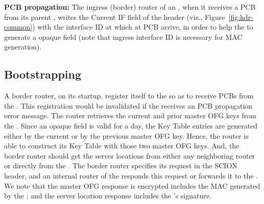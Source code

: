 {\bf PCB propagation: } The ingress (border) router of an \AD, when it receives a PCB from its parent \AD, writes the Current IF field of the header (viz., Figure~\ref{fig:hdr-common}) with the interface ID at which at PCB arrive, in order to help the \BS to generate a opaque field (note that ingress interface ID is necessary for MAC generation).
 
\subsection{Bootstrapping}
A border router, on its startup, register itself to the \BS so as to receive PCBs from the \BS. This registration would be invalidated if the \BS receives an PCB propagation error message.  The router retrieves the current and prior master OFG keys from the \CS. Since an opaque field is valid for a day, the Key Table entries are generated either by the current or by the previous master OFG key. Hence, the router is able to construct its Key Table with those two master OFG keys. And, the border router should get the server locations from either any neighboring router or directly from the \CS. The border router specifies its request in the SCION header, and an internal router of the \AD responds this request or forwards it to the \CS. We note that the master OFG response is encrypted includes the MAC generated by the \CS; and the server location response includes the \CS's signature.

